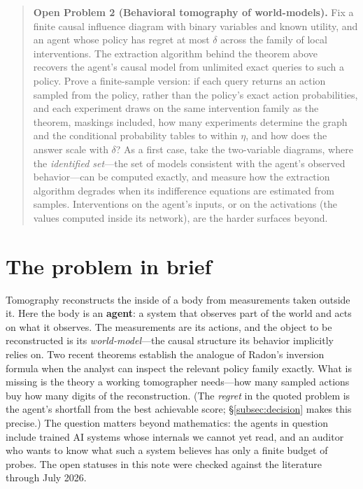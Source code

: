 \documentclass[11pt]{amsart}
\providecommand{\glsfirst}[2]{#2}
\theoremstyle{plain}
\theoremstyle{definition}
\begin{document}
\begin{quote}
\textbf{Open Problem 2 (Behavioral tomography of world-models).}
Fix a finite causal influence diagram with binary variables and known utility, and an agent whose policy has regret at most $\delta$ across the family of local interventions. The extraction algorithm behind the theorem above~\cite{richens2024} recovers the agent's causal model from unlimited exact queries to such a policy. Prove a finite-sample version: if each query returns an action sampled from the policy, rather than the policy's exact action probabilities, and each experiment draws on the same intervention family as the theorem, maskings included, how many experiments determine the graph and the conditional probability tables to within $\eta$, and how does the answer scale with $\delta$? As a first case, take the two-variable diagrams, where the \emph{identified set}---the set of models consistent with the agent's observed behavior---can be computed exactly, and measure how the extraction algorithm degrades when its indifference equations are estimated from samples. Interventions on the agent's inputs, or on the \glsfirst{activations}{activations} (the values computed inside its network), are the harder surfaces beyond.
\end{quote}


\section{The problem in brief}\label{sec:brief}



Tomography reconstructs the inside of a body from measurements taken outside it. Here the body is an \textbf{agent}: a system that observes part of the world and acts on what it observes. The measurements are its actions, and the object to be reconstructed is its \emph{world-model}---the causal structure its behavior implicitly relies on. Two recent theorems \cite{richens2024,richens2025} establish the analogue of Radon's inversion formula when the analyst can inspect the relevant policy family exactly. What is missing is the theory a working tomographer needs---how many sampled actions buy how many digits of the reconstruction. (The \emph{regret} in the quoted problem is the agent's shortfall from the best achievable score; \S\ref{subsec:decision} makes this precise.) The question matters beyond mathematics: the agents in question include trained AI systems whose internals we cannot yet read, and an auditor who wants to know what such a system believes has only a finite budget of probes. The open statuses in this note were checked against the literature through July 2026.
\end{document}
